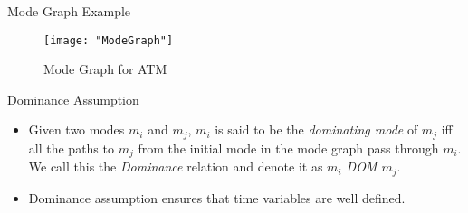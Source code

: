 \documentclass[10pt]{beamer}
\theoremstyle{plain}
\theoremstyle{definition}
\begin{document}
\begin{frame}{Mode Graph Example}
%			
	\begin{figure}[htp]
		\centering
		\texttt{[image: "ModeGraph"]}
		\caption{Mode Graph for ATM}
		\label{fig:Mode Graph for ATM}
	\end{figure}
\end{frame}

\begin{frame}{Dominance Assumption}
\begin{itemize}
	\item Given two modes $m_i$ and $m_j$, $m_i$ is said to be the \emph{dominating mode} of $m_j$ iff all the paths to $m_j$ from the initial mode in the mode graph pass through $m_i$. We call this the \emph{Dominance} relation and denote it as \emph{$m_i$ DOM $m_j$}.
	\item Dominance assumption ensures that time variables are well defined.
\end{itemize}
\end{frame}
\end{document}
